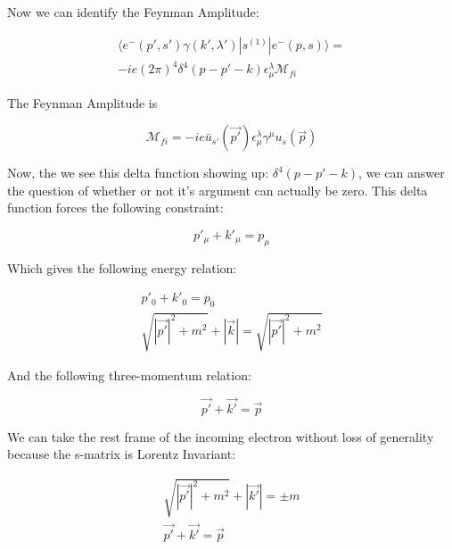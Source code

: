 \documentclass[a4]{article}
\begin{document}
\begin{framed}
        Now we can identify the Feynman Amplitude:

        \begin{equation}
            \begin{aligned}
                \langle e^{-} (p', s') \gamma (k', \lambda') | s^{(1)} | e^{-} (p, s) \rangle = \\
                - i e (2 \pi)^{4} \delta^{4} (p - p' - k) \epsilon^{\lambda}_{\mu} \mathcal{M}_{fi}
            \end{aligned}
        \end{equation}

        The Feynman Amplitude is 

        \begin{equation}
            \mathcal{M}_{fi} = - i e \bar{u}_{s'} (\vec{p'}) \epsilon^{\lambda}_{\mu} \gamma^{\mu} u_{s} (\vec{p})
        \end{equation}

        Now, the we see this delta function showing up: $\delta^{4} (p - p' - k)$, we can answer the question of whether or not it's argument can actually be zero. This delta
        function forces the following constraint:

        \begin{equation}
            p'_{\mu} + k'_{\mu} = p_{\mu}
        \end{equation}

        Which gives the following energy relation:

        \begin{equation}
            \begin{aligned}
                p'_{0} + k'_{0} = p_{0} \\
                \sqrt{|\vec{p'}|^{2} + m^{2}} + |\vec{k}| = \sqrt{|\vec{p'}|^{2} + m^{2}}
            \end{aligned}
        \end{equation}

        And the following three-momentum relation:

        \begin{equation}
            \vec{p'} + \vec{k'} = \vec{p}
        \end{equation}

        We can take the rest frame of the incoming electron without loss of generality because the s-matrix is Lorentz Invariant:

        \begin{equation}
            \begin{aligned}
                \sqrt{|\vec{p'}|^{2} + m^{2}} + |\vec{k'}| = \pm m \\
                \vec{p'} + \vec{k'} = \vec{p}
            \end{aligned}
        \end{equation}


\end{framed}
\end{document}
